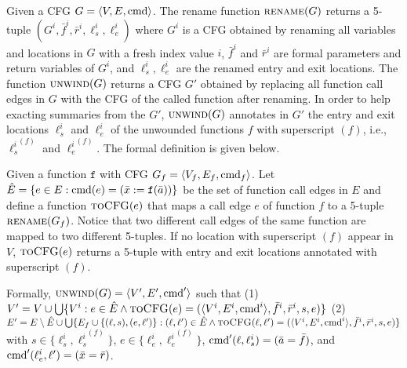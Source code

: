 Given a CFG $G=\langle
V, E,\textmd{cmd} \rangle$. The rename function $\textsc{rename}(G)$ returns a 5-tuple $(G^i, \bar{f}^i, \bar{r}^i,\ell_s^i,\ell_e^i)$ where $G^i$ is a CFG obtained by renaming all variables and locations in $G$ with a fresh index value $i$, $\bar{f}^i$ and $\bar{r}^i$ are formal parameters and return variables of $G^i$, and $\ell_s^i,\ell_e^i$ are the renamed entry and exit locations. The function $\textsc{unwind}(G)$ returns a CFG $G'$ obtained by replacing all function call edges in $G$ with the CFG of the called function after renaming. In order to help exacting summaries from the $G'$, $\textsc{unwind}(G)$ annotates in $G'$ the entry and exit locations ${\ell_s^i}$ and ${\ell_e^i}$ of the unwounded functions $f$ with superscript $(f)$, i.e., ${\ell_s^i}^{(f)}$ and ${\ell_e^i}^{(f)}$. The formal definition is given below.

Given a function $\mathtt{f}$ with CFG $G_f=\langle
V_f, E_f,\textmd{cmd}_f \rangle$.
Let $\hat{E} =\{e\in E: \textmd{cmd} (e)= (\bar{x}:=\mathtt{f}(\bar{a}))\}$ be the set of function call edges in $E$ and define a function $\textsc{toCFG}(e)$ that maps a call edge $e$ of function $f$ to a 5-tuple $\textsc{rename}(G_f)$. Notice that two different call edges of the same function are mapped to two different 5-tuples. If no location with superscript $(f)$ appear in $V$, $\textsc{toCFG}(e)$ returns a 5-tuple with entry and exit locations annotated with superscript $(f)$.

Formally, $\textsc{unwind}(G) = \langle V', E',\textmd{cmd}' \rangle$ such that (1) $V' = V\cup \bigcup\{V^i: e\in \hat{E} \wedge \textsc{toCFG}(e)= (\langle V^i, E^i,\textmd{cmd}^i \rangle, \bar{f}^i, \bar{r}^i,s,e) \}$ (2) $E'= E \setminus \hat{E} \cup \bigcup\{E_f\cup\{(\ell, s),(e, \ell')\}: (\ell, \ell')\in \hat{E} \wedge \textsc{toCFG}(\ell, \ell')= (\langle V^i, E^i,\textmd{cmd}^i \rangle, \bar{f}^i, \bar{r}^i,s,e) \}$ with $s\in \{\ell_s^i,{\ell_s^i}^{(f)}\}$, $e\in \{\ell_e^i,{\ell_e^i}^{(f)}\}$, $\textmd{cmd}' (\ell, {\ell_s^i}) = (\bar{a}=\bar{f})$, and $\textmd{cmd}' ({\ell_e^i}, \ell') = (\bar{x}=\bar{r})$.





